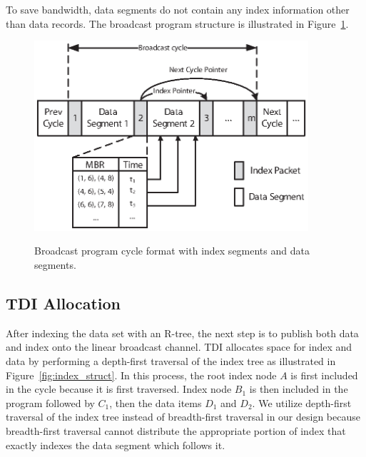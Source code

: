 To save bandwidth, data segments do not contain any index
information other than data records. The broadcast program
structure is illustrated in Figure~\ref{fig:index_packet}.

\begin{figure}[!h]
\begin{center}
\includegraphics[width=4in]{Figures/index_packet.eps}
\vspace*{-5pt} \caption{Broadcast program cycle format with index
segments and data segments.} \vspace*{-10pt}
\label{fig:index_packet}
\end{center}
\end{figure}

\subsection{TDI Allocation}

After indexing the data set with an R-tree, the next step is to
publish both data and index onto the linear broadcast channel. TDI
allocates space for index and data by performing a depth-first
traversal of the index tree as illustrated in
Figure~\ref{fig:index_struct}. In this process, the root index
node $A$ is first included in the cycle because it is first
traversed. Index node $B_1$ is then included in the program
followed by $C_1$, then the data items $D_1$ and $D_2$. We utilize
depth-first traversal of the index tree instead of breadth-first
traversal in our design because breadth-first traversal cannot
distribute the appropriate portion of index that exactly indexes
the data segment which follows it.


